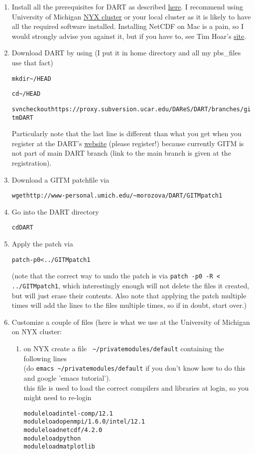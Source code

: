 \documentclass[letterpaper, 11 pt]{article}
\newenvironment{code} %
 {\quote\small\begin{alltt}} 
 {\end{alltt}\endquote}
\newcommand{\file}[1]{ {\tt \color{red} #1} }
\newcommand{\cmd}[1]{\begin{alltt}\colorbox{p_gr}{#1}\end{alltt} }
\begin{document}
\begin{enumerate}
\item Install all the prerequisites for DART as described \href{http://www.image.ucar.edu/DAReS/DART/DART_Starting.php}{here}. I recommend using University of Michigan \href{http://cac.engin.umich.edu/resources/systems/nyxV2}{NYX cluster} or your local cluster as it is likely to have all the required software installed. Installing NetCDF on Mac is a pain, so I would strongly advise you against it, but if you have to, see Tim Hoar's \href{http://www.image.ucar.edu/~thoar/BuildScripts/}{site}. 

\item Download DART by using (I put it in home directory and all my pbs\_files use that fact)
\cmd{mkdir \textasciitilde/HEAD}
\cmd{cd \textasciitilde/HEAD}
\cmd{svn checkout https://proxy.subversion.ucar.edu/DAReS/DART/branches/gitm DART}
Particularly note that the last line is different than what you get when you register at the DART's \href{http://www2.image.ucar.edu/forms/dart-software-download}{website} (please register!) because currently GITM is not part of main DART branch (link to the main branch is given at the registration).

\item Download a GITM patchfile via \cmd{wget http://www-personal.umich.edu/{\textasciitilde}morozova/DART/GITMpatch1}
\item Go into the DART directory \cmd{cd DART}
\item Apply the patch via \cmd{patch -p0 < ../GITMpatch1} (note that the correct way to undo the patch is via \verb|patch -p0 -R < ../GITMpatch1|, which interestingly enough will not delete the files it created, but will just erase their contents. Also note that applying the patch multiple times will add the lines to the files multiple times, so if in doubt, start over.)


\item Customize a couple of files (here is what we use at the University of Michigan on NYX cluster:

\begin{enumerate}
  \item on NYX create a file \file{\textasciitilde/privatemodules/default} containing the following lines\\ 
(do \verb|emacs ~/privatemodules/default| if you don't know how to do this and google 'emacs tutorial').\\
  this file is used to load the correct compilers and libraries at login, so you might need to re-login
  \begin{code}
module load intel-comp/12.1 
module load openmpi/1.6.0/intel/12.1
module load netcdf/4.2.0
module load python
module load matplotlib
  \end{code}


\end{enumerate}
\end{enumerate}
\end{document}

